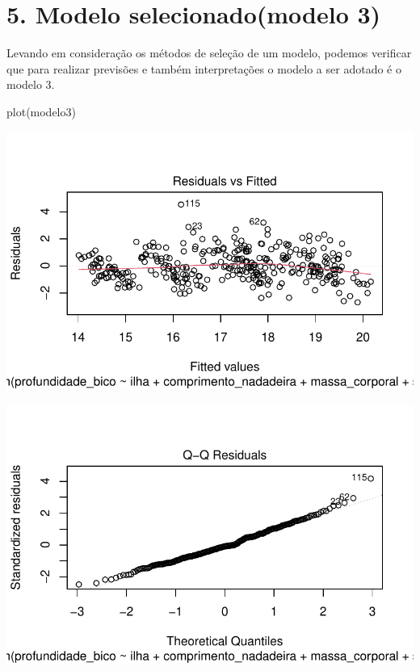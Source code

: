 \documentclass[
  letterpaper,
  DIV=11,
  numbers=noendperiod]{scrartcl}
\newenvironment{Shaded}{\begin{snugshade}}{\end{snugshade}}
\newcommand{\FunctionTok}[1]{\textcolor[rgb]{0.28,0.35,0.67}{#1}}
\newcommand{\NormalTok}[1]{\textcolor[rgb]{0.00,0.23,0.31}{#1}}
\begin{document}
\section{5. Modelo selecionado(modelo
3)}\label{modelo-selecionadomodelo-3}

Levando em consideração os métodos de seleção de um modelo, podemos
verificar que para realizar previsões e também interpretações o modelo a
ser adotado é o modelo 3.

\begin{Shaded}
\begin{Highlighting}[]
\FunctionTok{plot}\NormalTok{(modelo3)}
\end{Highlighting}
\end{Shaded}

\includegraphics{r_files/figure-pdf/unnamed-chunk-14-1.pdf}

\includegraphics{r_files/figure-pdf/unnamed-chunk-14-2.pdf}
\end{document}
